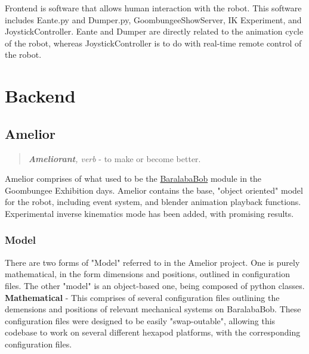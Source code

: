 		Frontend is software that allows human interaction with the robot. This software includes Eante.py and Dumper.py, GoombungeeShowServer, IK Experiment, and JoystickController. Eante and Dumper are directly related to the animation cycle of the robot, whereas JoystickController is to do with real-time remote control of the robot.\\
		\pagebreak

		\section{Backend}

			\subsection{Amelior}
				\label{Amelior}
				\begin{quote}
					\textit{\textbf{Ameliorant}, verb} - to make or 			become better.
				\end{quote}
			
				Amelior comprises of what used to be the \hyperref[BaralabaBob]{BaralabaBob} module in the Goombungee Exhibition days. Amelior contains the base, "object oriented" model for the robot, including event system, and blender animation playback functions. Experimental inverse kinematics mode has been added, with promising results.\\
			
				\subsubsection{Model}
					There are two forms of "Model" referred to in the Amelior project. One is purely mathematical, in the form dimensions and positions, outlined in configuration files. The other "model" is an object-based one, being composed of python classes.\\
					
					\textbf{Mathematical} - This comprises of several configuration files outlining the demensions and positions of relevant mechanical systems on BaralabaBob. These configuration files were designed to be easily "swap-outable", allowing this codebase to work on several different hexapod platforms, with the corresponding configuration files.\\
					
